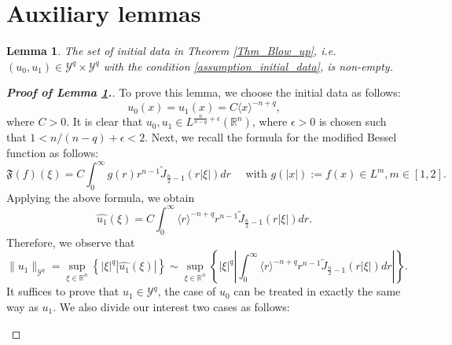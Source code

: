 \documentclass[11pt,reqno]{amsart}
\newtheorem{lemma}{Lemma}[section]
\begin{document}
\section{Auxiliary lemmas}
\begin{lemma} \label{non-empty}
The set of initial data in Theorem \ref{Thm_Blow_up}, i.e. $(u_0,u_1)\in\mathcal{Y}^q\times \mathcal{Y}^q$ with the condition \eqref{assumption_initial_data}, is non-empty.
\end{lemma}
\begin{proof}[\textbf{Proof of Lemma \ref{non-empty}.}]
To prove this lemma, we choose the initial data as follows:
$$
u_0(x)=u_1(x)=C\langle x\rangle^{-n+q},
$$
where $C > 0$.
It is clear that $u_0,u_1\in L^{\frac{n}{n-q}+\epsilon}(\mathbb{R}^n)$, where $\epsilon>0$ is chosen such that $1<n/(n-q)+\epsilon<2$. Next, we recall the formula for the modified Bessel function as follows:
$$
\mathfrak{F}(f)(\xi)=C\int_0^{\infty} g(r) r^{n-1} \tilde{J}_{\frac{n}{2}-1}(r|\xi|) d r \quad  \text{ with } g(|x|):=f(x) \in L^m, m \in [1, 2].
$$
Applying the above formula, we obtain
$$
\widehat{u_1}(\xi)=C \int_0^{\infty} \langle r\rangle^{-n+q}r^{n-1} \tilde{J}_{\frac{n}{2}-1}(r|\xi|) d r.
$$
Therefore, we observe that
$$
\|u_1\|_{\mathcal{Y}^q}=\sup_{\xi \in \mathbb{R}^n}\left\{|\xi|^q |\widehat{u_1}(\xi)|\right\} \sim \sup_{\xi \in \mathbb{R}^n}\left\{|\xi|^q \left|\int_0^{\infty} \langle r\rangle^{-n+q}r^{n-1} \tilde{J}_{\frac{n}{2}-1}(r|\xi|) d r\right|\right\}.
$$
It suffices to prove that $u_1 \in\mathcal{Y}^q$, the case of $u_0$ can be treated in exactly the same way as $u_1$. We also divide our interest two cases as follows:
\begin{itemize}[leftmargin=*]
        

\end{itemize}
\end{proof}
\end{document}
